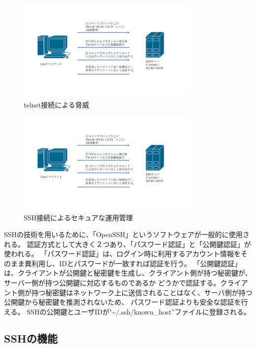 \documentclass[12pt,a4paper,titlepage]{jreport}
\begin{document}
\begin{figure}[h]
    \centering
    \includegraphics[width=0.8\textwidth, page=3]{graphs/network_archtecture.pdf}
    \caption{telnet接続による脅威}
    \label{telnet_flow}
\end{figure}
\begin{figure}[h]
    \centering
    \includegraphics[width=0.8\textwidth, page=4]{graphs/network_archtecture.pdf}
    \caption{SSH接続によるセキュアな運用管理}
    \label{SSH_security}
\end{figure}




SSHの技術を用いるために、「OpenSSH」というソフトウェアが一般的に使用される。
認証方式として大きく２つあり、「パスワード認証」と「公開鍵認証」が使われる。
「パスワード認証」は、ログイン時に利用するアカウント情報をそのまま異利用し、IDとパスワードが一致すれば認証を行う。
「公開鍵認証」は、クライアントが公開鍵と秘密鍵を生成し、クライアント側が持つ秘密鍵が、サーバー側が持つ公開鍵に対応するものであるか
どうかで認証する。クライアント側が持つ秘密鍵はネットワーク上に送信されることはなく、サーバ側が持つ公開鍵から秘密鍵を推測されないため、
パスワード認証よりも安全な認証を行える。
SSHの公開鍵とユーザIDが"\textasciitilde/.ssh/known\_host''ファイルに登録される。
\subsection{SSHの機能}
\end{document}
